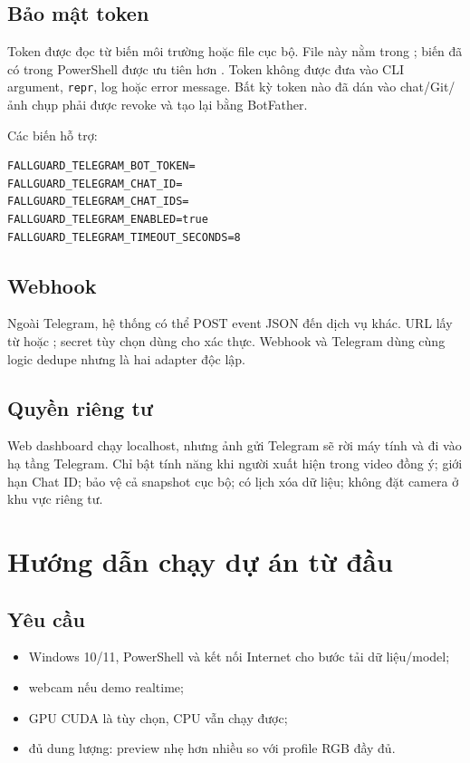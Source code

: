 \documentclass[12pt,a4paper,oneside]{report}
\newcommand{\code}[1]{\texttt{#1}}
\newcommand{\pathcode}[1]{\texttt{\detokenize{#1}}}
\begin{document}
\section{Bảo mật token}

Token được đọc từ biến môi trường hoặc file \pathcode{.env} cục bộ. File này
nằm trong \pathcode{.gitignore}; biến đã có trong PowerShell được ưu tiên hơn
\pathcode{.env}. Token không được đưa vào CLI argument, \code{repr}, log hoặc
error message. Bất kỳ token nào đã dán vào chat/Git/ảnh chụp phải được revoke và
tạo lại bằng BotFather.

Các biến hỗ trợ:

\begin{lstlisting}
FALLGUARD_TELEGRAM_BOT_TOKEN=
FALLGUARD_TELEGRAM_CHAT_ID=
FALLGUARD_TELEGRAM_CHAT_IDS=
FALLGUARD_TELEGRAM_ENABLED=true
FALLGUARD_TELEGRAM_TIMEOUT_SECONDS=8
\end{lstlisting}

\section{Webhook}

Ngoài Telegram, hệ thống có thể POST event JSON đến dịch vụ khác. URL lấy từ
 hoặc ; secret
tùy chọn dùng cho xác thực. Webhook và Telegram dùng cùng logic dedupe nhưng là
hai adapter độc lập.

\section{Quyền riêng tư}

Web dashboard chạy localhost, nhưng ảnh gửi Telegram sẽ rời máy tính và đi vào
hạ tầng Telegram. Chỉ bật tính năng khi người xuất hiện trong video đồng ý;
giới hạn Chat ID; bảo vệ cả snapshot cục bộ; có lịch xóa dữ liệu; không đặt
camera ở khu vực riêng tư.

\chapter{Hướng dẫn chạy dự án từ đầu}

\section{Yêu cầu}

\begin{itemize}
  \item Windows 10/11, PowerShell và kết nối Internet cho bước tải dữ liệu/model;
  \item webcam nếu demo realtime;
  \item GPU CUDA là tùy chọn, CPU vẫn chạy được;
  \item đủ dung lượng: preview nhẹ hơn nhiều so với profile RGB đầy đủ.
\end{itemize}
\end{document}
